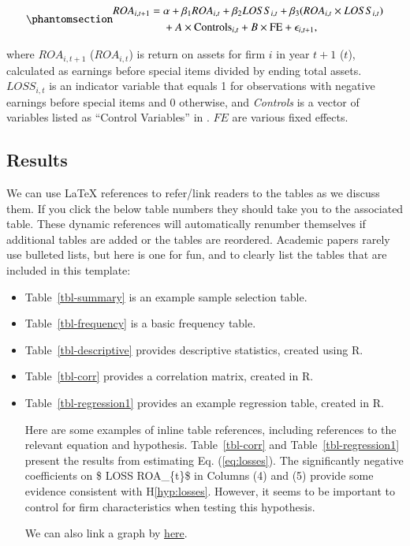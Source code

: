 \documentclass[
  authoryear,
  preprint]{elsarticle}
\begin{document}
\begin{equation}\phantomsection\label{eq-losses}{
\begin{aligned}
    ROA_{i,t+1} = {} & \alpha + \beta_1 ROA_{i,t} + \beta_2 LOSS_{i,t} + \beta_3 (ROA_{i,t} \times LOSS_{i,t}) \\
    & + A \times \text{Controls}_{i,t} + B \times \text{FE} + \epsilon_{i,t+1},
\end{aligned}
}\end{equation}

where \(ROA_{i,t+1}\) (\(ROA_{i,t}\)) is return on assets for firm \(i\)
in year \(t+1\) (\(t\)), calculated as earnings before special items
divided by ending total assets. \(LOSS_{i,t}\) is an indicator variable
that equals 1 for observations with negative earnings before special
items and 0 otherwise, and \emph{Controls} is a vector of variables
listed as ``Control Variables'' in \citep[Appendix][]{vars}. \(FE\) are
various fixed effects.

\subsection{Results}\label{results}

We can use LaTeX references to refer/link readers to the tables as we
discuss them. If you click the below table numbers they should take you
to the associated table. These dynamic references will automatically
renumber themselves if additional tables are added or the tables are
reordered. Academic papers rarely use bulleted lists, but here is one
for fun, and to clearly list the tables that are included in this
template:

\begin{itemize}
\item
  Table~\ref{tbl-summary} is an example sample selection table.
\item
  Table~\ref{tbl-frequency} is a basic frequency table.
\item
  Table~\ref{tbl-descriptive} provides descriptive statistics, created
  using R.
\item
  Table~\ref{tbl-corr} provides a correlation matrix, created in R.
\item
  Table~\ref{tbl-regression1} provides an example regression table,
  created in R.

  Here are some examples of inline table references, including
  references to the relevant equation and hypothesis.
  Table~\ref{tbl-corr} and Table~\ref{tbl-regression1} present the
  results from estimating Eq. (\ref{eq:losses}). The significantly
  negative coefficients on \$ LOSS \times ROA\_\{t\}\$ in Columns (4)
  and (5) provide some evidence consistent with H\ref{hyp:losses}.
  However, it seems to be important to control for firm characteristics
  when testing this hypothesis.

  We can also link a graph by \hyperref[fig-FF]{here}.
\end{itemize}
\end{document}
